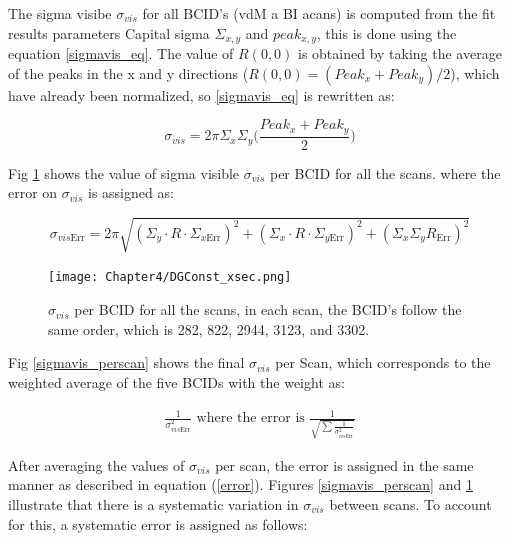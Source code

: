 The sigma visibe $\sigma_{vis}$ for all BCID's (vdM a BI acans) is computed from the fit results parameters Capital sigma $\Sigma_{x,y}$ and $peak_{x,y}$, this is done using the equation \ref{sigmavis_eq}. The value of $R(0,0)$ is obtained by taking the average of the peaks in the x and y directions ($R(0,0)=(Peak_{x}+Peak_{y})/2$), which have already been normalized, so \ref{sigmavis_eq} is rewritten as:

\begin{equation}
 \sigma_{vis}= 2\pi \Sigma_{x} \Sigma_{y} \Biggl( \frac{Peak_{x}+Peak_{y}}{2} \Biggl)
 \end{equation}
 
Fig \ref{sigmavis_perbcid} shows the  value of sigma visible $\sigma_{vis}$ per BCID for all the scans. where the error on $\sigma_{vis}$ is assigned as: 

\begin{equation}
\sigma_{vis\text{Err}}= 2 \pi \sqrt{ (\Sigma_{y} \cdot R \cdot \Sigma_{x\text{Err}})^{2} + (\Sigma_{x} \cdot R \cdot \Sigma_{y \text{Err}})^{2} + (\Sigma_{x} \Sigma_{y} R_{\text{Err}})^{2} }
\end{equation}

\begin{center}
  \begin{figure}[h!]
    \centering
    \texttt{[image: Chapter4/DGConst\_xsec.png]}
    \caption[$\sigma_{vis}$ per BCID for all scans]{ $\sigma_{vis}$ per BCID for all the scans,  in each scan, the BCID's follow the same order, which is 282, 822, 2944, 3123, and 3302.}
    \label{sigmavis_perbcid}
  \end{figure}
\end{center}


Fig \ref{sigmavis_perscan} shows the final  $\sigma_{vis}$ per Scan, which corresponds to the weighted average of the five BCIDs with the weight as: 

\begin{eqnarray}
\frac{1}{\sigma_{vis\text{Err}}^{2}}  \text{     where the error is     } \frac{1}{\sqrt{\sum \frac{1}{\sigma_{vis\text{Err}}^{2}}}}
\label{error}
\end{eqnarray}

After averaging the values of $\sigma_{vis}$ per scan, the error is assigned in the same manner as described in equation (\ref{error}). Figures \ref{sigmavis_perscan} and \ref{sigmavis_perbcid} illustrate that there is a systematic variation in $\sigma_{vis}$ between scans. To account for this, a systematic error is assigned as follows:


